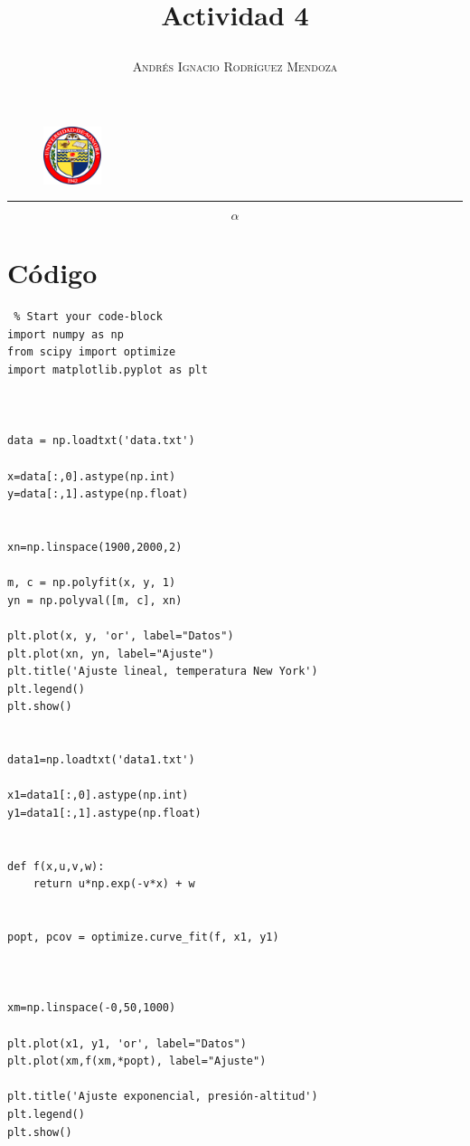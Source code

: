 \documentclass[11pt,spanish]{article}
\title{\vspace{-3cm}\begin{flushleft}\textbf{Actividad 4}\end{flushleft}}
\author{\hspace{-9.6cm}\textsc{Andrés Ignacio Rodríguez Mendoza}}
\date{}
\begin{document}
\begin{figure}
  \begin{center}
   \vspace{-5.4cm} \includegraphics[width=0.15\textwidth]{uni}
  \end{center}
\end{figure}

\maketitle  
\begin{center}
\rule{\textwidth}{1pt}
\end{center}

$$ \alpha $$

\section*{Código}

\begin{lstlisting} % Start your code-block
import numpy as np
from scipy import optimize
import matplotlib.pyplot as plt



data = np.loadtxt('data.txt')

x=data[:,0].astype(np.int)
y=data[:,1].astype(np.float)


xn=np.linspace(1900,2000,2)

m, c = np.polyfit(x, y, 1)
yn = np.polyval([m, c], xn)

plt.plot(x, y, 'or', label="Datos")
plt.plot(xn, yn, label="Ajuste")
plt.title('Ajuste lineal, temperatura New York')
plt.legend()
plt.show()


data1=np.loadtxt('data1.txt')

x1=data1[:,0].astype(np.int)
y1=data1[:,1].astype(np.float)


def f(x,u,v,w):
    return u*np.exp(-v*x) + w
    
    
popt, pcov = optimize.curve_fit(f, x1, y1)


    
xm=np.linspace(-0,50,1000)

plt.plot(x1, y1, 'or', label="Datos")
plt.plot(xm,f(xm,*popt), label="Ajuste")

plt.title('Ajuste exponencial, presión-altitud')
plt.legend()
plt.show()

\end{lstlisting}
\end{document}
